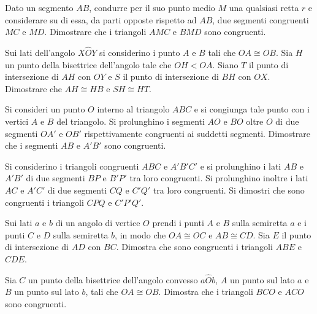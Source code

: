 \begin{multicols}{2}
\begin{esercizio}
\label{ese:2.19}
Dato un segmento $AB$, condurre per il suo punto medio $M$ una qualsiasi retta $r$ e considerare su di essa, da parti opposte rispetto ad $AB$, due segmenti congruenti $MC$ e $MD$. Dimostrare che i triangoli $AMC$ e $BMD$ sono congruenti.
\end{esercizio}

\begin{esercizio}
\label{ese:2.20}
Sui lati dell'angolo $X\widehat{O}Y$ si considerino i punto $A$ e $B$ tali che $OA\cong OB$. Sia $H$ un punto della bisettrice dell'angolo tale che $OH<OA$. Siano $T$ il punto di intersezione di $AH$ con $OY$ e $S$ il punto di intersezione di $BH$ con $OX$. Dimostrare che $AH\cong HB$ e $SH\cong HT$.
\end{esercizio}

\begin{esercizio}
\label{ese:2.21}
Si consideri un punto $O$ interno al triangolo $ABC$ e si congiunga tale punto con i vertici $A$ e $B$ del triangolo. Si prolunghino i segmenti $AO$ e $BO$ oltre $O$ di due segmenti $OA'$ e $OB'$ rispettivamente congruenti ai suddetti segmenti. Dimostrare che i segmenti $AB$ e $A'B'$ sono congruenti.
\end{esercizio}

\begin{esercizio}
\label{ese:2.22}
Si considerino i triangoli congruenti $ABC$ e $A'B'C'$ e si prolunghino i lati $AB$ e $A'B'$ di due segmenti $BP$ e $B'P'$ tra loro congruenti. Si prolunghino inoltre i lati $AC$ e $A'C'$ di due segmenti $CQ$ e $C'Q'$ tra loro congruenti. Si dimostri che sono congruenti i triangoli $CPQ$ e $C'P'Q'$.
\end{esercizio}

\begin{esercizio}
\label{ese:2.23}
Sui lati $a$ e $b$ di un angolo di vertice $O$ prendi i punti $A$ e $B$ sulla semiretta $a$ e i punti $C$ e $D$ sulla semiretta $b$, in modo che $OA\cong OC$ e $AB\cong CD$. Sia $E$ il punto di intersezione di $AD$ con $BC$. Dimostra che sono congruenti i triangoli $ABE$ e $CDE$.
\end{esercizio}

\begin{esercizio}
\label{ese:2.24}
Sia $C$ un punto della bisettrice dell'angolo convesso $a\widehat{O}b$, $A$ un punto sul lato $a$ e $B$ un punto sul lato $b$, tali che $OA\cong OB$. Dimostra che i triangoli $BCO$ e $ACO$ sono congruenti.
\end{esercizio}


\end{multicols}
